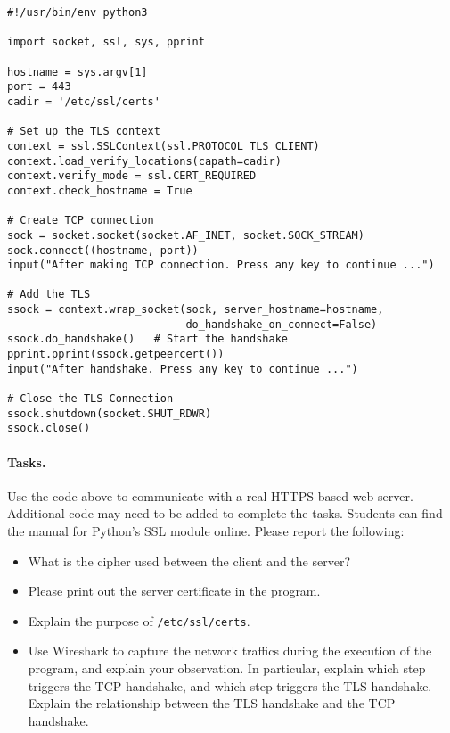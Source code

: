 \begin{lstlisting}[caption={\texttt{handshake.py}}, label={tls:handshake}]
#!/usr/bin/env python3

import socket, ssl, sys, pprint

hostname = sys.argv[1]
port = 443
cadir = '/etc/ssl/certs'   

# Set up the TLS context 
context = ssl.SSLContext(ssl.PROTOCOL_TLS_CLIENT) 
context.load_verify_locations(capath=cadir)
context.verify_mode = ssl.CERT_REQUIRED
context.check_hostname = True

# Create TCP connection 
sock = socket.socket(socket.AF_INET, socket.SOCK_STREAM)
sock.connect((hostname, port))
input("After making TCP connection. Press any key to continue ...")

# Add the TLS 
ssock = context.wrap_socket(sock, server_hostname=hostname,
                            do_handshake_on_connect=False)
ssock.do_handshake()   # Start the handshake
pprint.pprint(ssock.getpeercert())
input("After handshake. Press any key to continue ...")

# Close the TLS Connection
ssock.shutdown(socket.SHUT_RDWR)
ssock.close()
\end{lstlisting}
 



\paragraph{Tasks.} Use the code above to communicate with a real HTTPS-based web server.
Additional code may need to be added to complete the tasks. Students can find the manual
for Python's SSL module online.  Please report the following:
\begin{itemize}
\item What is the cipher used between the client and the server? 
\item Please print out the server certificate in the program.
\item Explain the purpose of \texttt{/etc/ssl/certs}.
\item Use Wireshark to capture the network traffics during the 
execution of the program, and explain your observation. In particular,
explain which step triggers the TCP handshake, and which
step triggers the TLS handshake. Explain the relationship between
 the TLS handshake and the TCP handshake. 
\end{itemize}
 


